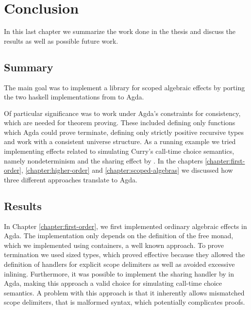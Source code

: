 \documentclass[10pt,a4paper,twoside,notitlepage]{report}
\begin{document}
\chapter{Conclusion}
\label{chapter:conclusion}

In this last chapter we summarize the work done in the thesis and discuss the
results as well as possible future work.

\section{Summary}

The main goal was to implement a library for scoped algebraic effects by
porting the two haskell implementations from
 to Agda.

Of particular significance was to work under Agda's constraints for consistency,
which are needed for theorem proving.
These included defining only functions which Agda could prove terminate, defining
only strictly positive recursive types and work with a consistent universe
structure.
As a running example we tried implementing effects related to simulating Curry's
call-time choice semantics, namely nondeterminism and the sharing effect by
\textcite{bunkenburg2019modeling}.
In the chapters \ref{chapter:first-order}, \ref{chapter:higher-order} and
\ref{chapter:scoped-algebras} we discussed how three different approaches
translate to Agda.


\section{Results}

In Chapter \ref{chapter:first-order}, we first implemented ordinary algebraic
effects in Agda.
The implementation only depends on the definition of the free monad, which
we implemented using containers, a well known approach.
To prove termination we used sized types, which proved effective because they
allowed the definition of \textcite{DBLP:conf/haskell/WuSH14} handlers for
explicit scope delimiters as well as avoided excessive inlining.
Furthermore, it was possible to implement the sharing handler by
\textcite{bunkenburg2019modeling} in Agda, making this approach a valid choice
for simulating call-time choice semantics.
A problem with this approach is that it inherently allows mismatched scope
delimiters, that is malformed syntax, which potentially complicates proofs.
\end{document}
